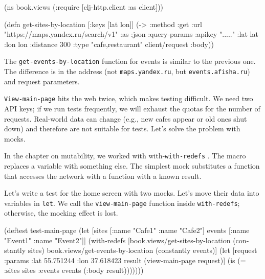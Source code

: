 \else

\begin{english}
  \begin{clojure}
(ns book.views
  (:require [clj-http.client :as client]))

(defn get-sites-by-location
  [{:keys [lat lon]}]
  (-> {:method :get
       :url "https://maps.yandex.ru/search/v1"
       :as :json
       :query-params {:apikey "....."
                      :lat lat :lon lon :distance 300
                      :type "cafe,restaurant"}}
      client/request
      :body))
  \end{clojure}
\end{english}

\fi

The \verb|get-events-by-location| function for events is similar to the previous one. The difference is in the address (not \verb|maps.yandex.ru|, but \verb|events.afisha.ru|) and request parameters.

\verb|View-main-page| hits the web twice, which makes testing difficult. We need two API keys; if we run tests frequently, we will exhaust the quotas for the number of requests. Real-world data can change (e.g., new cafes appear or old ones shut down) and therefore are not suitable for tests. Let's solve the problem with mocks.


In the chapter on mutability, we worked with with-\verb|with-redefs| . The macro replaces a variable with something else. The simplest mock substitutes a function that accesses the network with a function with a known result.

Let's write a test for the home screen with two mocks. Let's move their data into variables in \verb|let|. We call the \verb|view-main-page| function inside \verb|with-redefs|; otherwise, the mocking effect is lost.

\ifx\DEVICETYPE\MOBILE

\begin{english}
  \begin{clojure}
(deftest test-main-page
  (let [sites [{:name "Cafe1"}
               {:name "Cafe2"}]
        events [{:name "Event1"}
                {:name "Event2"}]]
    (with-redefs
      [book.views/get-sites-by-location
       (constantly sites)
       book.views/get-events-by-location
       (constantly events)]
      (let [request
            {:params {:lat 55.751244
                      :lon 37.618423}}
            result
            (view-main-page request)]
        (is (= {:sites sites
               :events events}
               (:body result)))))))
  \end{clojure}
\end{english}

